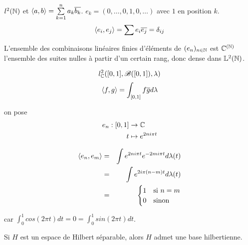 \begin{example}
	$l^2(\mathbb{N})$  et $\left\langle a, b \right\rangle = \sum\limits_{k=1}^n a_k \overline{b_k}$.
	$e_k = (0, \ldots, 0, 1, 0, \ldots)$ avec $1$ en position $k$.
	$$ \left\langle e_i, e_j \right\rangle = \sum e_i \overline{e_j} = \delta_{ij} $$

	L'ensemble des combinaisons linéaires finies d'éléments de $(e_n)_{n\in \mathbb{N}}$ est $\mathbb{C}^{(\mathbb{N})}$ l'ensemble des suites nulles à partir d'un certain rang, donc dense dans $\mathbb{L}^2(\mathbb{N})$.
\end{example}

\begin{example}
	$$l^2_{\mathbb{C}}([0,1], \mathscr{B}([0,1]), \lambda)$$
	$$\left\langle f, g \right\rangle = \int_{[0,1]} f \overline g d \lambda$$

	on pose \begin{align*}
		e_n : [0,1] & \to \mathbb{C}               \\
		t           & \mapsto e^{2ni\pi t}
	\end{align*}

	\begin{eqnarray*}
		\left\langle e_n, e_m \right\rangle &=& \int e^{2ni\pi t} e^{-2mi\pi t} d \lambda (t) \\
		&=& \int  e^{2i\pi (n-m) t} d \lambda (t) \\
		&=& \begin{cases} 1 & \text{si } n=m \\ 0 & \text{sinon} \end{cases}
	\end{eqnarray*}

	car $\int_0^1 cos (2 \pi t) d t = 0 = \int_0^1 sin(2 \pi t) d t$.
\end{example}


\begin{theorem}
	Si $H$ est un espace de Hilbert séparable, alors $H$ admet une base hilbertienne.
\end{theorem}

